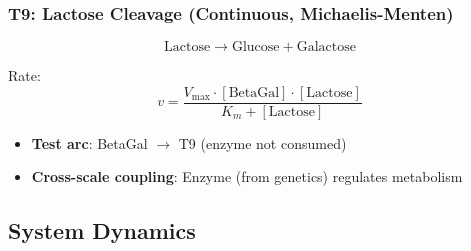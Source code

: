 \subsubsection{T9: Lactose Cleavage (Continuous, Michaelis-Menten)}

\begin{equation}
\text{Lactose} \to \text{Glucose} + \text{Galactose}
\end{equation}

Rate:
\begin{equation}
v = \frac{V_{\max} \cdot [\text{BetaGal}] \cdot [\text{Lactose}]}{K_m + [\text{Lactose}]}
\end{equation}

\begin{itemize}
    \item \textbf{Test arc}: BetaGal $\to$ T9 (enzyme not consumed)
    \item \textbf{Cross-scale coupling}: Enzyme (from genetics) regulates metabolism
\end{itemize}

\subsection{System Dynamics}
\label{subsec:lac-dynamics}

